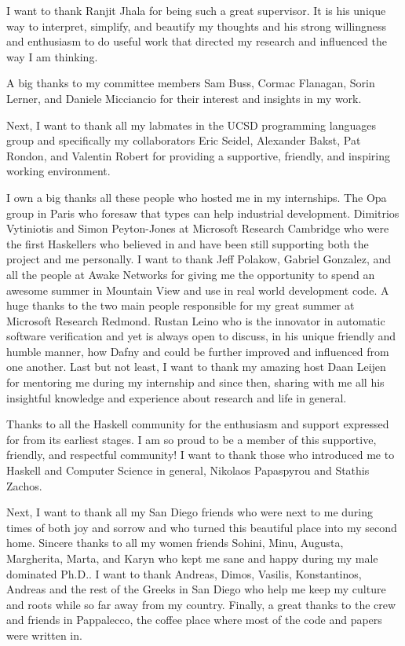 I want to thank Ranjit Jhala for being such a great supervisor. 
%
It is his unique way to interpret, simplify, and beautify my 
thoughts
and his strong willingness and enthusiasm to do useful work 
that directed my research and influenced the way I am thinking. 

A big thanks to my committee members 
Sam Buss, 
Cormac Flanagan,
Sorin Lerner, 
and Daniele Micciancio for their interest and insights in my work. 

Next, I want to thank all my labmates in the UCSD programming languages group and specifically my 
collaborators
Eric Seidel, 
Alexander Bakst,
Pat Rondon, and 
Valentin Robert
for providing a supportive, friendly, and inspiring working environment.

I own a big thanks all these people who hosted me in my internships. 
%
The Opa group in Paris who foresaw that types can help industrial development.
%
Dimitrios Vytiniotis and Simon Peyton-Jones
at Microsoft Research Cambridge
who were the first Haskellers who believed in \toolname
and have been still supporting both the project and me personally.
%
I want to thank Jeff Polakow, Gabriel Gonzalez, and all the people at Awake Networks 
for giving me the opportunity to spend an awesome summer in Mountain View 
and use \toolname in real world development code. 
%
A huge thanks to the two main people responsible for my great summer at 
Microsoft Research Redmond.
%
Rustan Leino who is the innovator in automatic software verification
and yet is always open to discuss, in his unique friendly and humble manner, 
how Dafny and \toolname could be further improved and influenced from one another. 
% 
Last but not least, I want to thank my amazing host
Daan Leijen for mentoring me during my internship and since then, 
sharing with me all his insightful knowledge and experience 
about research and life in general.

Thanks to all the Haskell community 
for the enthusiasm and support expressed for \toolname 
from its earliest stages. 
%
I am so proud to be a member of this 
supportive, friendly, and respectful
community! 
%
I want to thank those who introduced me to 
Haskell and Computer Science in general, 
Nikolaos Papaspyrou and Stathis Zachos. 


Next, I want to thank all my San Diego friends who were next to me 
during times of both joy and sorrow and 
who turned this beautiful place into 
my second home.
% 
Sincere thanks to all my women friends
Sohini, Minu, Augusta, Margherita, Marta, and Karyn
who kept me sane and happy during my male dominated Ph.D..
%
I want to thank 
Andreas, Dimos, Vasilis, Konstantinos, Andreas
and the rest of the Greeks in San Diego who help me 
keep my culture and roots while so far away from my country.
%
Finally, a great thanks to the crew and friends in Pappalecco, 
the coffee place where most of the \toolname code and papers were written in. 


